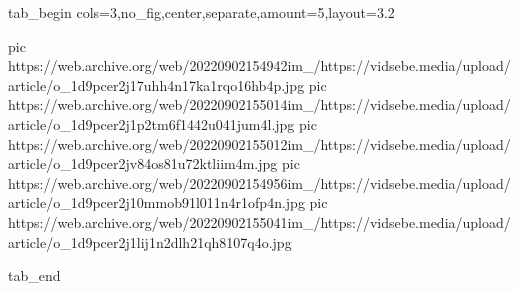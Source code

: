  
 
 
 
 


\ifcmt
  tab_begin cols=3,no_fig,center,separate,amount=5,layout=3.2

     pic https://web.archive.org/web/20220902154942im_/https://vidsebe.media/upload/article/o_1d9pcer2j17uhh4n17ka1rqo16hb4p.jpg
		 pic https://web.archive.org/web/20220902155014im_/https://vidsebe.media/upload/article/o_1d9pcer2j1p2tm6f1442u041jum4l.jpg
		 pic https://web.archive.org/web/20220902155012im_/https://vidsebe.media/upload/article/o_1d9pcer2jv84os81u72ktliim4m.jpg
		 pic https://web.archive.org/web/20220902154956im_/https://vidsebe.media/upload/article/o_1d9pcer2j10mmob91l011n4r1ofp4n.jpg
		 pic https://web.archive.org/web/20220902155041im_/https://vidsebe.media/upload/article/o_1d9pcer2j1lij1n2dlh21qh8107q4o.jpg

  tab_end
\fi
